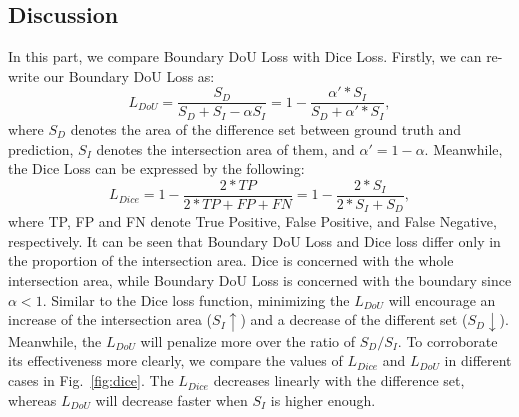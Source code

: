 \documentclass[runningheads]{llncs}
\begin{document}


\subsection{Discussion}


In this part, we compare Boundary DoU Loss with Dice Loss. Firstly, we can re-write our Boundary DoU Loss as:
\begin{equation}
L_{DoU}= \frac{S_D}{S_D+S_I - \alpha S_I} = 1 - \frac{\alpha' * S_I}{S_D+\alpha'*S_I},
\end{equation}
where $S_D$ denotes the area of the difference set between ground truth and prediction, $S_I$ denotes the intersection area of them, and $\alpha'=1-\alpha$. Meanwhile, the Dice Loss can be expressed by the following: 
\begin{equation}
L_{Dice} = 1-\frac{2*TP}{2*TP+FP+FN}=1-\frac{2*S_I}{2*S_I+S_D},
\end{equation}
where TP, FP and FN denote True Positive, False Positive, and False Negative, respectively. 
It can be seen that Boundary DoU Loss and Dice loss differ only in the proportion of the intersection area. Dice is concerned with the whole intersection area, while Boundary DoU Loss is concerned with the boundary since $\alpha<1$. Similar to the Dice loss function, minimizing the $L_{DoU}$ will encourage an increase of the intersection area ($S_I\uparrow$) and a decrease of the different set ($S_D\downarrow$). Meanwhile, the $L_{DoU}$ will penalize more over the ratio of ${S_D}/{S_I}$.
To corroborate its effectiveness more clearly, we compare the values of $L_{Dice}$ and $L_{DoU}$ in different cases in Fig.~\ref{fig:dice}. The $L_{Dice}$ decreases linearly with the difference set, whereas $L_{DoU}$ will decrease faster when $S_I$ is higher enough.
\end{document}

